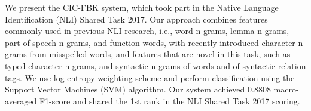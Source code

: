 We present the CIC-FBK system, which took part in the Native Language Identification (NLI) Shared Task 2017. Our approach combines features commonly used in previous NLI research, i.e., word n-grams, lemma n-grams, part-of-speech n-grams, and function words, with recently introduced character n-grams from misspelled words, and features that are novel in this task, such as typed character n-grams, and syntactic n-grams of words and of syntactic relation tags. We use log-entropy weighting scheme and perform classification using the Support Vector Machines (SVM) algorithm. Our system achieved 0.8808 macro-averaged F1-score and shared the 1st rank in the NLI Shared Task 2017 scoring.
